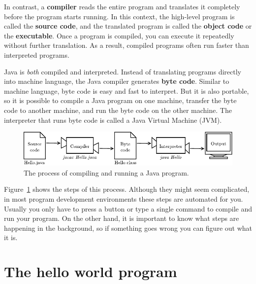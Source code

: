 \documentclass[12pt]{book}
\theoremstyle{exercise}
\begin{document}

In contrast, a {\bf compiler} reads the entire program and translates it completely before the program starts running.
In this context, the high-level program is called the {\bf source code}, and the translated program is called the {\bf object code} or the {\bf executable}.
Once a program is compiled, you can execute it repeatedly without further translation.
As a result, compiled programs often run faster than interpreted programs.


Java is {\em both} compiled and interpreted.
Instead of translating programs directly into machine language, the Java compiler generates {\bf byte code}.
Similar to machine language, byte code is easy and fast to interpret.
But it is also portable, so it is possible to compile a Java program on one machine, transfer the byte code to another machine, and run the byte code on the other machine.
The interpreter that runs byte code is called a Java Virtual Machine (JVM).

\begin{figure}[!ht]
\begin{center}
\includegraphics{figs/compiler.pdf}
\caption{The process of compiling and running a Java program.}
\label{fig.compile}
\end{center}
\end{figure}

Figure~\ref{fig.compile} shows the steps of this process.
Although they might seem complicated, in most program development environments these steps are automated for you.
Usually you only have to press a button or type a single command to compile and run your program.
On the other hand, it is important to know what steps are happening in the background, so if something goes wrong you can figure out what it is.


\section{The hello world program}
\label{hello}
\end{document}
